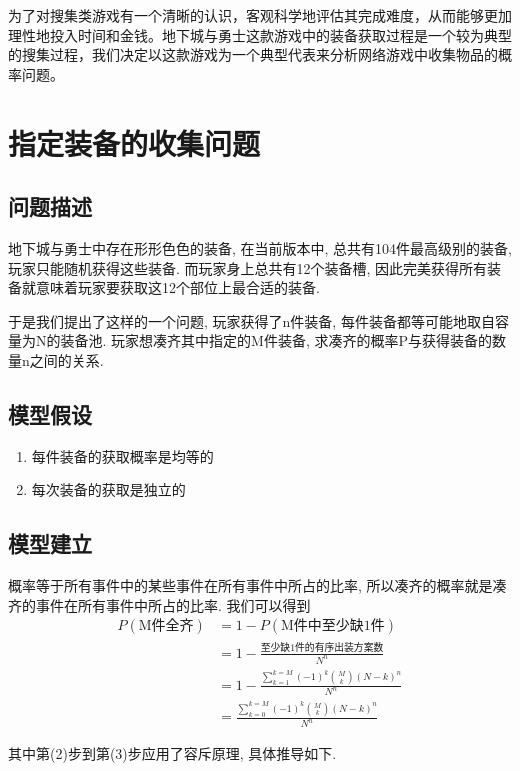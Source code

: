 \documentclass[10pt,journal,compsoc]{IEEEtran}
\begin{document}
  为了对搜集类游戏有一个清晰的认识，客观科学地评估其完成难度，从而能够更加理性地投入时间和金钱。地下城与勇士这款游戏中的装备获取过程是一个较为典型的搜集过程，我们决定以这款游戏为一个典型代表来分析网络游戏中收集物品的概率问题。

\section{指定装备的收集问题}

  \subsection{问题描述}
    地下城与勇士中存在形形色色的装备, 在当前版本中, 总共有104件最高级别的装备, 玩家只能随机获得这些装备. 而玩家身上总共有12个装备槽, 因此完美获得所有装备就意味着玩家要获取这12个部位上最合适的装备.

    于是我们提出了这样的一个问题, 玩家获得了n件装备, 每件装备都等可能地取自容量为N的装备池. 玩家想凑齐其中指定的M件装备, 求凑齐的概率P与获得装备的数量n之间的关系.

  \subsection{模型假设}
    \begin{enumerate}
      \item 每件装备的获取概率是均等的
      \item 每次装备的获取是独立的
    \end{enumerate}

  \subsection{模型建立}
    概率等于所有事件中的某些事件在所有事件中所占的比率, 所以凑齐的概率就是凑齐的事件在所有事件中所占的比率. 我们可以得到
    \begin{align}
      P(\text{M件全齐}) &= 1-P(\text{M件中至少缺1件})\\
      &= 1-\frac{\text{至少缺1件的有序出装方案数}}{N^n}\\
      &= 1-\frac{\sum_{k=1}^{k=M}(-1)^k\binom{M}{k}(N-k)^n}{N^n}\\
      &= \frac{\sum_{k=0}^{k=M}(-1)^k\binom{M}{k}(N-k)^n}{N^n}
    \end{align}
    
    其中第(2)步到第(3)步应用了容斥原理, 具体推导如下.
    
\end{document}
